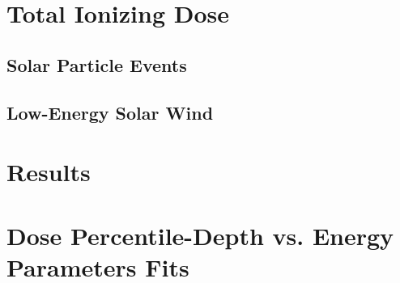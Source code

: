 \documentclass{hitec}
\begin{document}
\section{Total Ionizing Dose}

\subsection{Solar Particle Events}


\subsection{Low-Energy Solar Wind}

\section{Results}

\appendix

\section{Dose Percentile-Depth vs. Energy Parameters Fits}
\label{App:Dose Percentile-Depth vs. Energy Parameters Fits}
\end{document}

